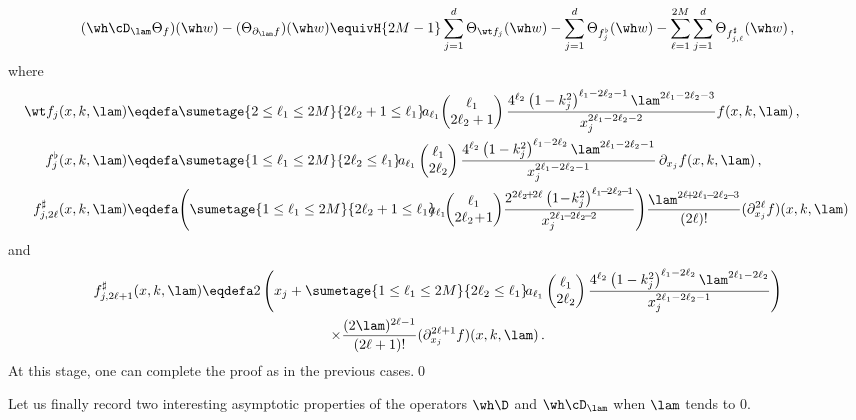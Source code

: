 \[
(\wh\cD_\lam \Theta_f)(\wh w) - (\Theta_{\partial_\lam f})(\wh w) \equivH {2M-1} \sum_{j=1}^d \Theta_{\wt f_j} (\wh w) - \sum_{j=1}^d \Theta_{f^\flat _j} (\wh w) - \sum_{\ell=1} ^{2M} \sum_{j=1}^d \Theta_{f^\sharp _{j,\ell}} (\wh w)
\,,
\]
where
\begin{align*}
\wt f_j (x,k,\lam) &\eqdefa \sumetage {2\leq \ell_1\leq 2M} {2\ell_2+1\leq \ell_1} \!a_{\ell_1}\!
\begin{pmatrix} \ell_1 \\ 2\ell_2+1
\end{pmatrix} \frac {4^{\ell_2}
\left(1-k_j^2\right)^{\ell_1-2\ell_2-1} \lam^{2\ell_1-2\ell_2-3 }} {x_j^{2\ell_1-2\ell_2-2}} f (x,k,\lam)\,,
\\
f^\flat _j(x,k,\lam) &\eqdefa \sumetage {1\leq \ell_1\leq 2M} {2\ell_2\leq \ell_1} \! a_{\ell_1}
\begin{pmatrix} \ell_1 \\ 2\ell_2
\end{pmatrix} \frac {4^{\ell_2} \left(1-k_j^2\right)^{\ell_1-2\ell_2} \lam^{2\ell_1-2\ell_2-1}} {x_j ^{2\ell_1-2\ell_2-1}}\, \partial_{x_j}f (x,k,\lam)\,,
\\
f^\sharp _{j,2\ell}(x,k,\lam) &\eqdefa\! \left(\sumetage {1\leq \ell_1\leq 2M} {2\ell_2+1\leq \ell_1} \!\!\!a_{\ell_1}\!\!
\begin{pmatrix} \ell_1 \\ 2\ell_2\!+\!1
\end{pmatrix}\! \frac {2^{2\ell_2\!+\!2\ell}
\left(1\!-\!k_j^2\right)^{\ell_1\!-\!2\ell_2\!-\!1} } {x_j^{2\ell_1\!-\!2\ell_2\!-\!2}}\right)\!\frac { \lam^{2\ell \!+\! 2\ell_1\!-\!2\ell_2\!-\!3 }} {(2\ell)!} (\partial_{x_j}^{2\ell} f)(x,k,\lam)\,
\end{align*}
and
\begin{multline*}
f^\sharp _{j,2\ell+1}(x,k,\lam) \eqdefa 2 \left(x_j +\sumetage {1\leq \ell_1\leq 2M} {2\ell_2\leq \ell_1} \! a_{\ell_1}
\begin{pmatrix} \ell_1 \\ 2\ell_2
\end{pmatrix} \frac {4^{\ell_2} \left(1-k_j^2\right)^{\ell_1-2\ell_2} \lam^{2\ell_1-2\ell_2 }} {x_j^{2\ell_1-2\ell_2-1}}\right)\\
\times \frac {(2\lam)^{2\ell -1}}{(2\ell+1)!} (\partial^{2\ell+1}_{x_j} f)(x,k,\lam)\,.
\end{multline*}
At this stage, one can complete the proof as in the previous cases.\qed

Let us finally record two interesting asymptotic properties of the operators $\wh \D$ and $\wh \cD_\lam$ when $\lam$ tends to $0$.

